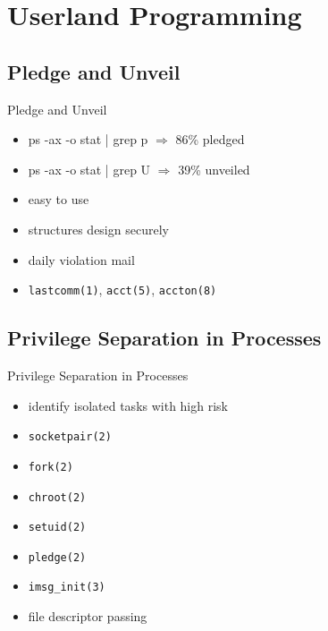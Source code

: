 \documentclass[14pt,aspectratio=169]{beamer}
\begin{document}
\section{Userland Programming}

\subsection{Pledge and Unveil}
\begin{frame}{Pledge and Unveil}
\begin{itemize}
  \item ps -ax -o stat | grep p $\Rightarrow$ 86\% pledged
  \item ps -ax -o stat | grep U $\Rightarrow$ 39\% unveiled
  \item easy to use
  \item structures design securely
  \item daily violation mail
  \item \texttt{lastcomm(1)}, \texttt{acct(5)}, \texttt{accton(8)}
\end{itemize}
\end{frame}

\subsection{Privilege Separation in Processes}
\begin{frame}{Privilege Separation in Processes}
\begin{itemize}
  \item identify isolated tasks with high risk
  \item \texttt{socketpair(2)}
  \item \texttt{fork(2)}
  \item \texttt{chroot(2)}
  \item \texttt{setuid(2)}
  \item \texttt{pledge(2)}
  \item \texttt{imsg\_init(3)}
  \item file descriptor passing
\end{itemize}
\end{frame}
\end{document}
